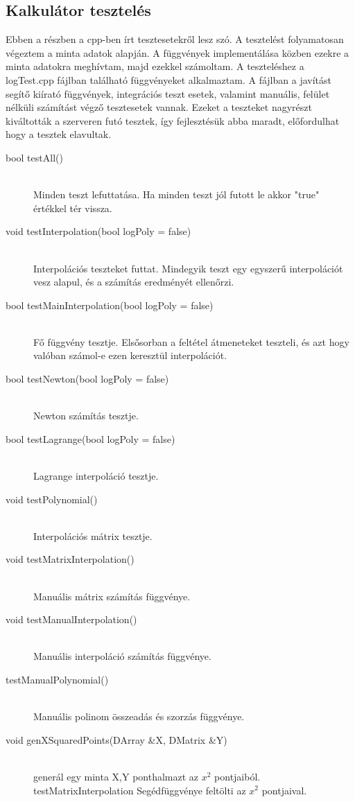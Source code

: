 \subsection{Kalkulátor tesztelés}
	Ebben a részben a cpp-ben írt tesztesetekről lesz szó. \newline
	A tesztelést folyamatosan végeztem a minta adatok alapján. A függvények implementálása közben ezekre a minta adatokra meghívtam, majd ezekkel számoltam. A teszteléshez a logTest.cpp fájlban található függvényeket alkalmaztam. \newline
	A fájlban a javítást segítő kiírató függvények, integrációs teszt esetek, valamint manuális, felület nélküli számítást végző tesztesetek vannak. \newline
	Ezeket a teszteket nagyrészt kiváltották a szerveren futó tesztek, így fejlesztésük abba maradt, előfordulhat hogy a tesztek elavultak.
	\begin{description}
		\item[bool testAll()] \hfill \\ 
			Minden teszt lefuttatása. Ha minden teszt jól futott le akkor "true" értékkel tér vissza.
		\item[void testInterpolation(bool logPoly = false)] \hfill \\ 
			Interpolációs teszteket futtat.
			Mindegyik teszt egy egyszerű interpolációt vesz alapul, és a számítás eredményét ellenőrzi.
		\item[bool testMainInterpolation(bool logPoly = false)] \hfill \\ 
			Fő függvény tesztje. Elsősorban a feltétel átmeneteket teszteli, és azt hogy valóban számol-e ezen keresztül interpolációt.
		\item[bool testNewton(bool logPoly = false)] \hfill \\ 
			Newton számítás tesztje.
		\item[bool testLagrange(bool logPoly = false)] \hfill \\ 
			Lagrange interpoláció tesztje.
		\item[void testPolynomial()] \hfill \\ 
			Interpolációs mátrix tesztje.
		\item[void testMatrixInterpolation()] \hfill \\ 
			Manuális mátrix számítás függvénye.
		\item[void testManualInterpolation()] \hfill \\ 
			Manuális interpoláció számítás függvénye.

		\item[testManualPolynomial()] \hfill \\ 
			Manuális polinom összeadás és szorzás függvénye. 
		\item[void genXSquaredPoints(DArray \&X, DMatrix \&Y)] \hfill \\ 
			generál egy minta X,Y ponthalmazt az $x^{2}$ 
			pontjaiból.
		testMatrixInterpolation Segédfüggvénye
		feltölti az $x^{2}$ pontjaival.
	\end{description}

